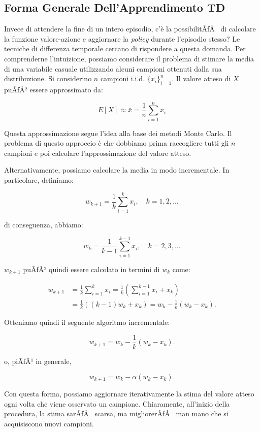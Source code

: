 ﻿\documentclass[11pt, a4paper]{report}
\begin{document}
\subsection{Forma Generale Dell'Apprendimento TD}

Invece di attendere la fine di un intero episodio, c'è la possibilitÃƒÂ  di calcolare la funzione valore-azione e aggiornare la \emph{policy} durante l'episodio stesso? Le tecniche di differenza temporale cercano di rispondere a questa domanda. Per comprenderne l'intuizione, possiamo considerare il problema di stimare la media di una variabile casuale utilizzando alcuni campioni ottenuti dalla sua distribuzione. Si considerino $n$ campioni i.i.d. $\{x_i\}_{i=1}^n$. Il valore atteso di $X$ puÃƒÂ² essere approssimato da:

\[
E[X] \approx \bar{x} = \frac{1}{n} \sum_{i=1}^n x_i \tag{5.1}
\]

Questa approssimazione segue l'idea alla base dei metodi Monte Carlo. Il problema di questo approccio è che dobbiamo prima raccogliere tutti gli $n$ campioni e poi calcolare l'approssimazione del valore atteso.

Alternativamente, possiamo calcolare la media in modo incrementale. In particolare, definiamo:

\[
w_{k+1} = \frac{1}{k} \sum_{i=1}^k x_i, \quad k = 1, 2, \dots
\]

di conseguenza, abbiamo:

\[
w_k = \frac{1}{k-1} \sum_{i=1}^{k-1} x_i, \quad k = 2, 3, \dots
\]

\newpage

$w_{k+1}$ puÃƒÂ² quindi essere calcolato in termini di $w_k$ come:

\begin{align*}
w_{k+1} &= \frac{1}{k} \sum_{i=1}^k x_i = \frac{1}{k} \left( \sum_{i=1}^{k-1} x_i + x_k \right) \\
&= \frac{1}{k} \left( (k-1)w_k + x_k \right) = w_k - \frac{1}{k}(w_k - x_k).
\end{align*}

Otteniamo quindi il seguente algoritmo incrementale:

\[
w_{k+1} = w_k - \frac{1}{k}(w_k - x_k).
\]

o, piÃƒÂ¹ in generale,

\[
w_{k+1} = w_k - \alpha(w_k - x_k).
\]

Con questa forma, possiamo aggiornare iterativamente la stima del valore atteso ogni volta che viene osservato un campione. Chiaramente, all'inizio della procedura, la stima sarÃƒÂ  scarsa, ma migliorerÃƒÂ  man mano che si acquisiscono nuovi campioni.
\end{document}

